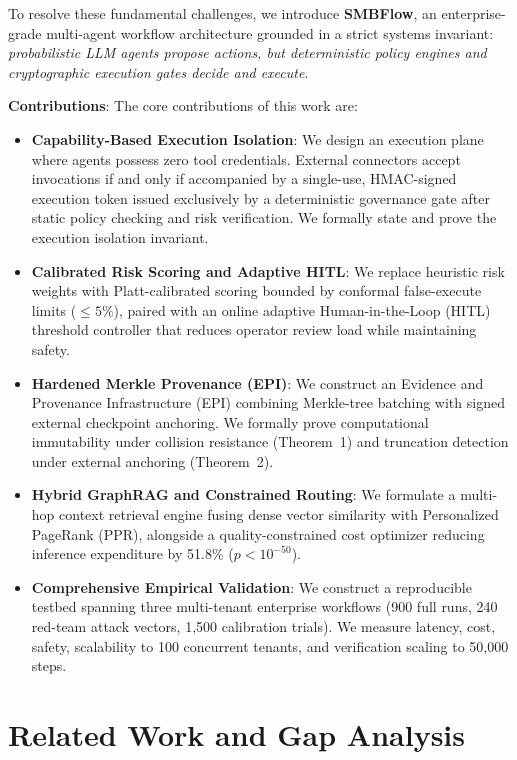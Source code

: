 \documentclass[conference]{IEEEtran}
\begin{document}
To resolve these fundamental challenges, we introduce \textbf{SMBFlow}, an enterprise-grade multi-agent workflow architecture grounded in a strict systems invariant: \emph{probabilistic LLM agents propose actions, but deterministic policy engines and cryptographic execution gates decide and execute}.

\textbf{Contributions}: The core contributions of this work are:
\begin{itemize}\setlength{\itemsep}{0pt}\setlength{\parskip}{0pt}
    \item \textbf{Capability-Based Execution Isolation}: We design an execution plane where agents possess zero tool credentials. External connectors accept invocations if and only if accompanied by a single-use, HMAC-signed execution token issued exclusively by a deterministic governance gate after static policy checking and risk verification. We formally state and prove the execution isolation invariant.
    \item \textbf{Calibrated Risk Scoring and Adaptive HITL}: We replace heuristic risk weights with Platt-calibrated scoring bounded by conformal false-execute limits ($\le 5\%$), paired with an online adaptive Human-in-the-Loop (HITL) threshold controller that reduces operator review load while maintaining safety.
    \item \textbf{Hardened Merkle Provenance (EPI)}: We construct an Evidence and Provenance Infrastructure (EPI) combining Merkle-tree batching with signed external checkpoint anchoring. We formally prove computational immutability under collision resistance (Theorem~1) and truncation detection under external anchoring (Theorem~2).
    \item \textbf{Hybrid GraphRAG and Constrained Routing}: We formulate a multi-hop context retrieval engine fusing dense vector similarity with Personalized PageRank (PPR), alongside a quality-constrained cost optimizer reducing inference expenditure by 51.8\% ($p < 10^{-50}$).
    \item \textbf{Comprehensive Empirical Validation}: We construct a reproducible testbed spanning three multi-tenant enterprise workflows (900 full runs, 240 red-team attack vectors, 1,500 calibration trials). We measure latency, cost, safety, scalability to 100 concurrent tenants, and verification scaling to 50,000 steps.
\end{itemize}

\section{Related Work and Gap Analysis}
\end{document}
